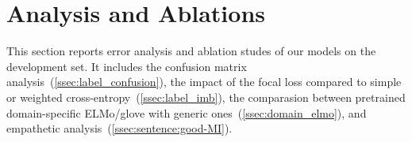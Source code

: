 \section{Analysis and Ablations}
\label{sec:snt:analysis}
This section reports error analysis and ablation studes of our models
on the development set. It includes the confusion matrix
analysis~(\autoref{ssec:label_confusion}), the impact of the focal
loss compared to simple or weighted
cross-entropy~(\autoref{ssec:label_imb}), the comparasion between
pretrained domain-specific ELMo/glove with generic
ones~(\autoref{ssec:domain_elmo}), and empathetic analysis~(\autoref{ssec:sentence:good-MI}).











